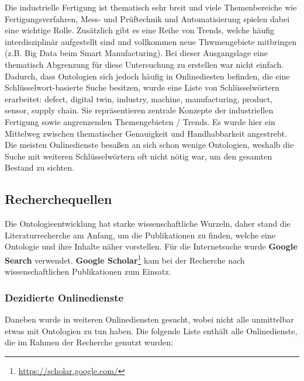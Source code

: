 \documentclass{article}
\begin{document}
Die industrielle Fertigung ist thematisch sehr breit und viele Themenbereiche wie Fertigungsverfahren, Mess- und Prüftechnik und Automatisierung spielen dabei eine wichtige Rolle.
Zusätzlich gibt es eine Reihe von Trends, welche häufig interdisziplinär aufgestellt sind und vollkommen neue Thwmengebiete mitbringen (z.B. Big Data beim Smart Manufacturing).
Bei dieser Ausgangslage eine thematisch Abgrenzung für diese Untersuchung zu erstellen war nicht einfach.
Dadurch, dass Ontologien sich jedoch häufig in Onlinediesten befinden, die eine Schlüsselwort-basierte Suche besitzen, wurde eine Liste von Schlüsselwörtern erarbeitet: defect, digital twin, industry, machine, manufacturing, product, sensor, supply chain.
Sie repräsentieren zentrale Konzepte der industriellen Fertigung sowie angrenzenden Themengebieten / Trends.
Es wurde hier ein Mittelweg zwischen thematischer Genauigkeit und Handhabbarkeit angestrebt.
Die meisten Onlinedienste besaßen an sich schon wenige Ontologien, weshalb die Suche mit weiteren Schlüsselwörtern oft nicht nötig war, um den gesamten Bestand zu sichten.

\subsection{Recherchequellen}

Die Ontologieentwicklung hat starke wissenschaftliche Wurzeln, daher stand die Literaturrecherche am Anfang, um die Publikationen zu finden, welche eine Ontologie und ihre Inhalte näher vorstellen.
Für die Internetsuche wurde \textbf{Google Search} verwendet.
\textbf{Google Scholar}\footnote{\url{https://scholar.google.com/}} kam bei der Recherche nach wissenschaftlichen Publikationen zum Einsatz.

\subsubsection{Dezidierte Onlinedienste}

Daneben wurde in weiteren Onlinediensten gesucht, wobei nicht alle unmittelbar etwas mit Ontologien zu tun haben.
Die folgende Liste enthält alle Onlinedienste, die im Rahmen der Recherche genutzt wurden:
\end{document}
